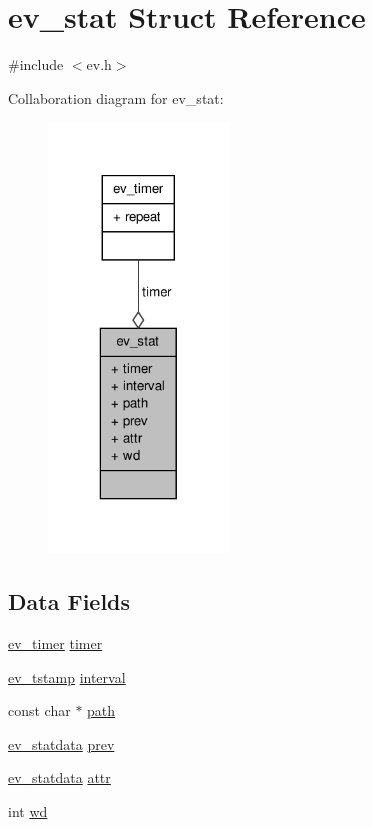 \hypertarget{structev__stat}{\section{ev\-\_\-stat \-Struct \-Reference}
\label{structev__stat}
}


{\ttfamily \#include $<$ev.\-h$>$}



\-Collaboration diagram for ev\-\_\-stat\-:
\nopagebreak
\begin{figure}[H]
\begin{center}
\leavevmode
\includegraphics[width=136pt]{structev__stat__coll__graph}
\end{center}
\end{figure}
\subsection*{\-Data \-Fields}
\begin{DoxyCompactItemize}
\item 
\hyperlink{structev__timer}{ev\-\_\-timer} \hyperlink{structev__stat_a56d2f62405e7a2bba42204f714803c7c}{timer}
\item 
\hyperlink{ev_8h_add71e34ce2b04bbf7eb6f31a850814e8}{ev\-\_\-tstamp} \hyperlink{structev__stat_a710c94a682e5e9281b2e5162e265b726}{interval}
\item 
const char $\ast$ \hyperlink{structev__stat_a3b02c6de5c049804444a246f7fdf46b4}{path}
\item 
\hyperlink{ev_8h_af7665657cb718a911fd591bc0613db83}{ev\-\_\-statdata} \hyperlink{structev__stat_a02b7b656210f66c84f0b28cf3f4c745d}{prev}
\item 
\hyperlink{ev_8h_af7665657cb718a911fd591bc0613db83}{ev\-\_\-statdata} \hyperlink{structev__stat_a597fb418c2fd88ae12847805bddbe09d}{attr}
\item 
int \hyperlink{structev__stat_a3707c399a8d778793ccd2c311867ac44}{wd}
\end{DoxyCompactItemize}


